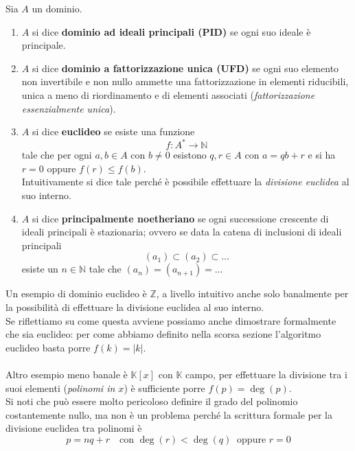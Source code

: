 \begin{definizione}
	Sia $A$ un dominio.
	\begin{enumerate}
		\item $A$ si dice \textbf{dominio ad ideali principali (PID)} se ogni suo ideale è principale.
		\item $A$ si dice \textbf{dominio a fattorizzazione unica (UFD)} se ogni suo elemento non invertibile e non nullo ammette una fattorizzazione in elementi riducibili, unica a meno di riordinamento e di elementi associati (\textit{fattorizzazione essenzialmente unica}).
		\item $A$ si dice \textbf{euclideo} se esiste una funzione 
		\begin{equation*}
		f: A^*\longrightarrow \mathbb{N}
		\end{equation*}
		tale che per ogni $a,b\in A$ con $b \neq 0$ esistono $q,r \in A$ con $a=qb+r$ e si ha $r=0$ oppure $f(r)\leq f(b)$. \\
		Intuitivamente si dice tale perché è possibile effettuare la \textit{divisione euclidea} al suo interno.
		\item $A$ si dice \textbf{principalmente noetheriano} se ogni successione crescente di ideali principali è stazionaria; ovvero se data la catena di inclusioni di ideali principali
		\begin{equation*}
		(a_1)\subset(a_2)\subset \dots
		\end{equation*}
		esiste un $n\in\mathbb{N}$ tale che $(a_n)=(a_{n+1})=\dots$
	\end{enumerate}
\end{definizione}
\begin{esempio}
	Un esempio di dominio euclideo è $\mathbb{Z}$, a livello intuitivo anche solo banalmente per la possibilità di effettuare la divisione euclidea al suo interno. \\ Se riflettiamo su come questa avviene possiamo anche dimostrare formalmente che sia euclideo: per come abbiamo definito nella scorsa sezione l'algoritmo euclideo basta porre $f(k)=|k|$. \\ \\ Altro esempio meno banale è $\mathbb{K}[x]$ con $\mathbb{K}$ campo, per effettuare la divisione tra i suoi elementi (\textit{polinomi in $x$}) è sufficiente porre $f(p)=\deg(p)$. \\ Si noti che può essere molto pericoloso definire il grado del polinomio costantemente nullo, ma non è un problema perché la scrittura formale per la divisione euclidea tra polinomi è 
	\begin{equation*}
	p=nq+r \ \ \ \text{ con } \deg(r)<\deg(q) \ \text{ oppure } r=0
	\end{equation*}
\end{esempio}




